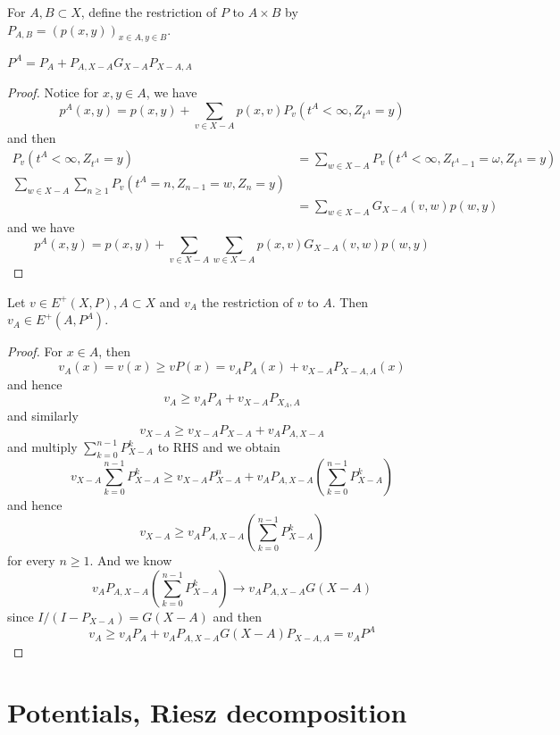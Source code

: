 \documentclass[lang=en, color=blue, ]{elegantbook}
\begin{document}
\begin{definition}
    For $A,B\subset X$, define the restriction of $P$ to $A\times B$ by $P_{A,B} = (p(x,y))_{x\in A, y\in B}$.
\end{definition}

\begin{lemma}
    $P^A = P_A + P_{A,X-A}G_{X-A}P_{X-A,A}$
\end{lemma}
\begin{proof}
    Notice for $x,y\in A$, we have
    \[
    p^A(x,y) = p(x,y)+ \sum\limits_{v\in X-A}p(x,v)P_v(t^A<\infty, Z_{t^A} = y)
    \]
    and then
    \[
    \begin{aligned}
    P_v(t^A < \infty,Z_{t^A} = y) &= \sum\limits_{w\in X-A} P_v(t^A<\infty, Z_{t^A - 1} = \omega, Z_{t^A} = y)\\
    \sum\limits_{w\in X-A} \sum\limits_{n\geq 1}P_v(t^A = n, Z_{n-1} = w, Z_n = y) \\ &= \sum\limits_{w\in X-A}G_{X-A}(v,w)p(w,y)
    \end{aligned}
    \]
    and we have
    \[
    p^{A}(x,y) = p(x,y) + \sum\limits_{v\in X-A}\sum\limits_{w \in X-A}p(x,v)G_{X-A}(v,w)p(w,y)
    \]
\end{proof}

\begin{theorem}
    Let $v\in E^+(X,P), A\subset X$ and $v_A$ the restriction of $v$ to $A$. Then $v_A \in E^+(A,P^A)$.
\end{theorem}
\begin{proof}
    For $x\in A$, then
    \[v_A(x) = v(x )\geq vP(x) = v_AP_A(x) + v_{X-A}P_{X-A, A}(x)\]
    and hence
    \[
    v_A \geq v_AP_A + v_{X-A}P_{X_A,A}
    \]
    and similarly
    \[
    v_{X-A} \geq v_{X-A}P_{X-A} + v_AP_{A,X-A}
    \]
    and multiply $\sum\limits_{k=0}^{n-1}P_{X-A}^k$ to RHS and we obtain
    \[
    v_{X-A}\sum\limits_{k=0}^{n-1}P_{X-A}^k \geq v_{X-A}P_{X-A}^n + v_AP_{A,X-A}(\sum\limits_{k=0}^{n-1}P_{X-A}^k)
    \]
    and hence
    \[
    v_{X-A} \geq v_AP_{A,X-A}(\sum\limits_{k=0}^{n-1}P_{X-A}^k)
    \]
    for every $n\geq 1$. And we know
    \[v_AP_{A,X-A}(\sum\limits_{k=0}^{n-1}P_{X-A}^k) \to v_AP_{A,X-A} G(X-A)\]
    since $I/(I-P_{X-A}) = G(X-A)$ and then
    \[
    v_A \geq v_AP_A + v_AP_{A,X-A}G(X-A)P_{X-A,A} = v_AP^A
    \]
\end{proof}

\section{Potentials, Riesz decomposition}
\end{document}
